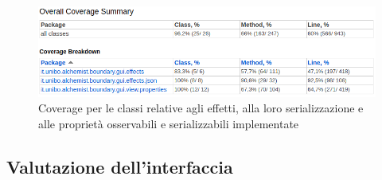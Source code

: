                 \begin{figure}[htbp]
                    \centering
                    \includegraphics[scale=0.58]{img/filteredCoverage}
                    \caption{Coverage per le classi relative agli effetti, alla loro serializzazione e alle proprietà osservabili e serializzabili implementate}
                    \label{fig:coverage}
                \end{figure}

            \subsection{Valutazione dell'interfaccia}
